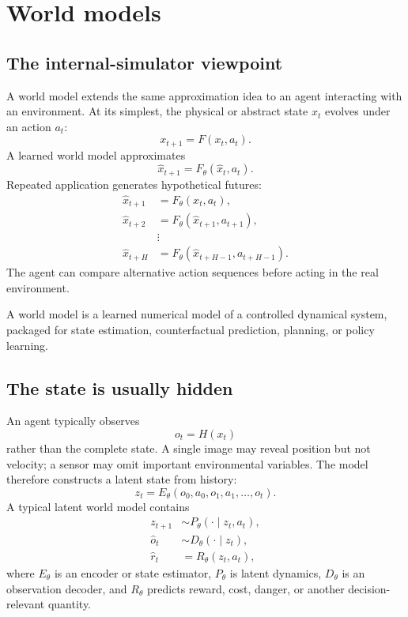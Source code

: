 \documentclass[11pt]{article}
\begin{document}
\section{World models}

\subsection{The internal-simulator viewpoint}

A world model extends the same approximation idea to an agent interacting with an environment. At its simplest, the physical or abstract state \(x_t\) evolves under an action \(a_t\):
\begin{equation}
 x_{t+1}=F(x_t,a_t).
\end{equation}
A learned world model approximates
\begin{equation}
 \widehat x_{t+1}=F_\theta(\widehat x_t,a_t).
\end{equation}
Repeated application generates hypothetical futures:
\begin{align*}
 \widehat x_{t+1}&=F_\theta(x_t,a_t),\\
 \widehat x_{t+2}&=F_\theta(\widehat x_{t+1},a_{t+1}),\\
 &\vdots\\
 \widehat x_{t+H}&=F_\theta(\widehat x_{t+H-1},a_{t+H-1}).
\end{align*}
The agent can compare alternative action sequences before acting in the real environment.

\begin{bigidea}
A world model is a learned numerical model of a controlled dynamical system, packaged for state estimation, counterfactual prediction, planning, or policy learning.
\end{bigidea}

\subsection{The state is usually hidden}

An agent typically observes
\[
 o_t=H(x_t)
\]
rather than the complete state. A single image may reveal position but not velocity; a sensor may omit important environmental variables. The model therefore constructs a latent state from history:
\begin{equation}
 z_t=E_\theta(o_0,a_0,o_1,a_1,\ldots,o_t).
\end{equation}
A typical latent world model contains
\begin{align}
 z_{t+1}&\sim P_\theta(\cdot\mid z_t,a_t),\\
 \widehat o_t&\sim D_\theta(\cdot\mid z_t),\\
 \widehat r_t&=R_\theta(z_t,a_t),
\end{align}
where \(E_\theta\) is an encoder or state estimator, \(P_\theta\) is latent dynamics, \(D_\theta\) is an observation decoder, and \(R_\theta\) predicts reward, cost, danger, or another decision-relevant quantity.
\end{document}
